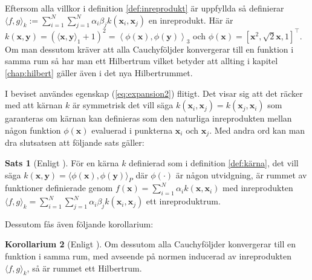 \documentclass[a4paper, 12pt]{report}
\theoremstyle{definition}
\newtheorem{thm}{Sats}[section]
\newtheorem{cor}[thm]{Korollarium}
\theoremstyle{remark}
\newcommand{\bfx}{\mathbf{x}}
\newcommand{\bfy}{\mathbf{y}}
\begin{document}
\begin{enumerate}

\end{enumerate}
Eftersom alla villkor i definition \ref{def:inreprodukt} är uppfyllda så definierar $\langle f, g\rangle_k:=\sum_{i=1}^{N}\sum_{j=1}^{N}\alpha_i\beta_jk\left(\bfx_i, \bfx_j\right)$ en inreprodukt. Här är $k\left(\bfx, \bfy\right)=\left(\langle \bfx, \bfy\rangle_1 + 1\right)^2= \left\langle \phi\left(\bfx\right),  \phi\left(\bfy\right)\right\rangle_3$ och $\phi\left(\bfx\right)=\left[\bfx^2, \sqrt{2}\bfx, 1 \right]^\intercal$. Om man dessutom kräver att alla Cauchyföljder konvergerar till en funktion i samma rum så har man ett Hilbertrum vilket betyder att allting i kapitel \ref{chap:hilbert} gäller även i det nya Hilbertrummet.

I beviset användes egenskap (\ref{eq:expansion2}) flitigt. Det visar sig att det räcker med att kärnan $k$ är symmetrisk det vill säga $k\left(\bfx_i, \bfx_j\right)=k\left(\bfx_j, \bfx_i\right)$ som garanteras om kärnan kan definieras som den naturliga inreprodukten mellan någon funktion $\phi\left(\mathbf{x}\right)$ evaluerad i punkterna $\bfx_i$ och $\bfx_j$. Med andra ord kan man dra slutsatsen att följande sats gäller:
\begin{thm}[Enligt \cite{LearningKernels}]\label{thm:kärnainreprodukt}
	För en kärna $k$ definierad som i definition \ref{def:kärna}, det vill säga $k\left(\bfx, \bfy\right)=\langle \phi\left(\bfx\right), \phi\left(\bfy\right)\rangle_P$ där $\phi\left(\cdot\right)$ är någon utvidgning, är rummet av funktioner definierade genom $f\left(\bfx\right) = \sum_{i=1}^{N}\alpha_ik\left(\bfx, \bfx_i\right)$ med inreprodukten $\langle f, g\rangle_k = \sum_{i=1}^{N}\sum_{j=1}^{N} \alpha_i\beta_jk\left(\bfx_i, \bfx_j\right)$ ett inreproduktrum.
\end{thm}
Dessutom fås även följande korollarium:
\begin{cor}[Enligt \cite{LearningKernels}]\label{cor:kärnahilbert}
	Om dessutom alla Cauchyföljder konvergerar till en funktion i samma rum, med avseende på normen inducerad av inreprodukten $\langle f, g\rangle_k$, så är rummet ett Hilbertrum.
\end{cor}
\end{document}
